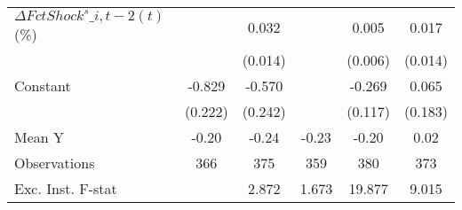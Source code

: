 {\begin{tabular}{l*{5}{c}}
\addlinespace
$ \Delta FctShock^s\_{i,t-2}(t)$ (\%)&                     &       0.032\sym{**} &                     &       0.005         &       0.017         \\
                    &                     &     (0.014)         &                     &     (0.006)         &     (0.014)         \\
\addlinespace
Constant            &      -0.829\sym{***}&      -0.570\sym{**} &                     &      -0.269\sym{**} &       0.065         \\
                    &     (0.222)         &     (0.242)         &                     &     (0.117)         &     (0.183)         \\
\midrule
Mean Y              &       -0.20         &       -0.24         &       -0.23         &       -0.20         &        0.02         \\
Observations        &         366         &         375         &         359         &         380         &         373         \\
Exc. Inst. F-stat   &                     &       2.872         &       1.673         &      19.877         &       9.015         \\
\bottomrule
\end{tabular}
}
